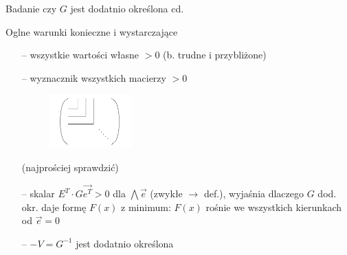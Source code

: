   \begin{frame}{Badanie czy $G$ jest dodatnio określona cd.}

    \begin{block}{Oglne warunki konieczne i wystarczające}
      \begin{itemize}
      		\item[--] wszystkie wartości własne $> 0$ (b. trudne i przybliżone)
      		\item[--] wyznacznik wszystkich macierzy $> 0$
      		\begin{figure}
				\centering
				\includegraphics[height=0.2\textheight ,width=0.3\textwidth]{img/17/matrix}
			\end{figure}
			(najprościej sprawdzić)
			\item[--] skalar $E^T \cdot G\vec{e^T} > 0$ dla $\bigwedge \vec{e}$ (zwykłe $\rightarrow$ def.), wyjaśnia dlaczego $G$ dod.
			okr. daje formę $F(x)$ z minimum: $F(x)$ rośnie we wszystkich kierunkach od $\vec{e} = 0$
			\item[--] $-V = G^{-1}$ jest dodatnio określona
      \end{itemize}
    \end{block}

  \end{frame}

